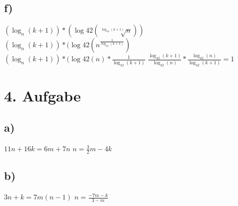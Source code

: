 \documentclass{article}
\begin{document}
    \subsection*{f)}
    $(\log_{n}(k+1)) * (\log{42}(\sqrt[\log_{42}(k+1)]{n}))$ \newline
    $(\log_{n}(k+1)) * (\log{42}(n^{\frac{1}{\log_{42}(k+1)}})$ \newline
    $(\log_{n}(k+1)) * (\log{42}(n) * \frac{1}{\log_{42}(k+1)}$ \newline
    $\frac{\log_{42}(k+1)}{\log_{42}(n)} * \frac{\log_{42}(n)}{\log_{42}(k+1)} = 1$

\section*{4. Aufgabe}

    \subsection*{a)}
    $11n +16k = 6m + 7n$ \newline
    $n= \frac{3}{2}m - 4k$
    \subsection*{b)}
    $3n + k = 7m(n-1)$ \newline
    $n = \frac{-7m-k}{3-m}$
\end{document}
